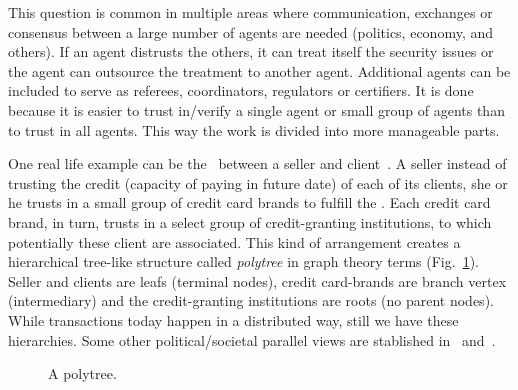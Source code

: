 \documentclass[../main.tex]{subfiles}
\begin{document}
This question is common in multiple areas where communication, exchanges or consensus between a large number of agents are needed (politics, economy, and others).
If an agent distrusts the others, it can treat itself the security issues or the agent can outsource the treatment to another agent.
Additional agents can be included to serve as referees, coordinators, regulators or certifiers. It is done because it is easier to trust in/verify a single agent or small group of agents than to trust in all agents. This way the work is divided into more manageable parts.

One real life example can be the \EFT\ between a seller and client~\cite{Staskauskas1988}. A seller instead of trusting the credit (capacity of paying in future date) of each of its clients, she or he trusts in a small group of credit card brands to fulfill the \EFT{}.
Each credit card brand, in turn, trusts in a select group of credit-granting institutions, to which potentially these client are associated.
This kind of arrangement creates a hierarchical tree-like structure called \emph{polytree} in graph theory terms (Fig.~\ref{fig:polytree_topology}). Seller and clients are leafs (terminal nodes), credit card-brands are branch vertex (intermediary) and the credit-granting institutions are roots (no parent nodes). While transactions today happen in a distributed way, still we have these hierarchies.
Some other political/societal parallel views are stablished in~\cite{McNamaraEtAl2018} and~\cite{OlaruEtAl2018}.
\begin{figure}[h]
  \centering
  \caption{A polytree.}\label{fig:polytree_topology}
\end{figure}
\end{document}
